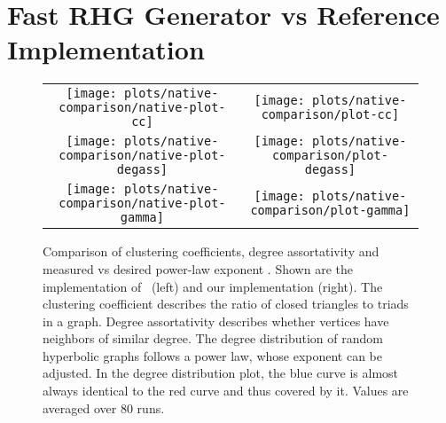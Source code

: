 \documentclass{llncs}
\begin{document}
\section{Fast RHG Generator vs Reference Implementation~\cite{Aldecoa2015}}
\label{sec:comparison-previous-impl}
\begin{figure}[!h]
\centering
\begin{tabular}{cc}
\texttt{[image: plots/native-comparison/native-plot-cc]} & \texttt{[image: plots/native-comparison/plot-cc]}\\
\texttt{[image: plots/native-comparison/native-plot-degass]} & \texttt{[image: plots/native-comparison/plot-degass]}\\
\texttt{[image: plots/native-comparison/native-plot-gamma]} & \texttt{[image: plots/native-comparison/plot-gamma]}\\
\end{tabular} 
\caption{Comparison of clustering coefficients, degree assortativity and measured vs desired power-law exponent .
Shown are the implementation of~\cite{Aldecoa2015} (left) and our implementation (right).
The clustering coefficient describes the ratio of closed triangles to triads in a graph.
Degree assortativity describes whether vertices have neighbors of similar degree.
The degree distribution of random hyperbolic graphs follows a power law, whose exponent  can be adjusted.
In the degree distribution plot, the blue curve is almost always identical to the red curve and thus covered by it.
Values are averaged over 80 runs.}
\label{plot:properties-comparison-I}
\end{figure}
\end{document}
